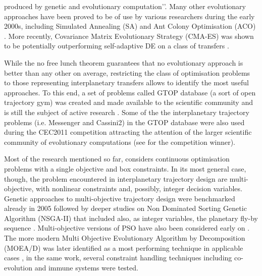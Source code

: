 \documentclass[graybox]{svmult}
\begin{document}
produced by genetic and evolutionary computation\rq\rq. Many other evolutionary approaches have been proved to be of use by various researchers during the early 2000s, including Simulated Annealing (SA) \cite{luo2005simulated} and Ant Colony Optimisation (ACO) \cite{radice2006ant, ceriotti2010mga}. More recently, Covariance Matrix Evolutionary Strategy (CMA-ES) was shown to be potentially outperforming self-adaptive DE on a class of transfers \cite{izzo2014constraint}.  

While the no free lunch theorem \cite{wolpert1997no} guarantees that no evolutionary approach is better than any other on average, restricting the class of optimisation problems to those representing interplanetary transfers allows to identify the most useful approaches. To this end, a set of problems called GTOP database \cite{vinko2008global} (a sort of open trajectory gym) was created and made available to the scientific community and is still the subject of active research \cite{stracquadanio2011design, addis2011global, schlueter2014midaco, islam2012adaptive, cassioli2012machine, simoes2014self}. Some of the the interplanetary trajectory problems (i.e. Messenger and Cassini2) in the GTOP database were also used during the CEC2011 competition attracting the attention of the larger scientific community of evolutionary computations (see \cite{elsayed2011ga} for the competition winner).

Most of the research mentioned so far, considers continuous optimisation problems with a single objective and box constraints. In its most general case, though, the problem encountered in interplanetary trajectory design are multi-objective,  with nonlinear constraints and, possibly, integer decision variables. Genetic approaches to multi-objective trajectory design were benchmarked already in 2005 \cite{lee2005multi} followed by deeper studies on Non Dominated Sorting Genetic Algorithm (NSGA-II) that included also, as integer variables, the planetary fly-by sequence \cite{deb2007interplanetary}. Multi-objective versions of PSO have also been considered early on \cite{lavagna2007multi}. The more modern Multi Objective Evolutionary Algorithm by Decomposition (MOEA/D) was later identified as a most performing technique in applicable cases \cite{izzo2014constraint}, in the same work, several constraint handling techniques including co-evolution and immune systems were tested.
\end{document}

